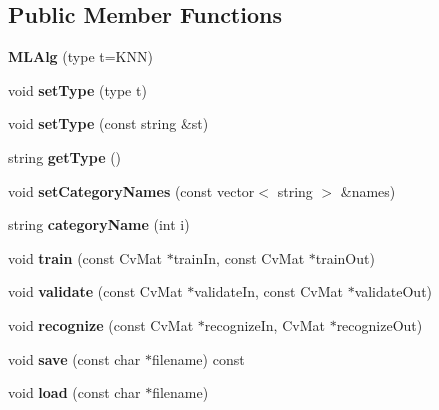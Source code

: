 \subsection*{\-Public \-Member \-Functions}
\begin{DoxyCompactItemize}
\item 
\hypertarget{class_m_l_alg_abe64a2a987f3564d4b8a555bc028a628}{{\bfseries \-M\-L\-Alg} (type t=\-K\-N\-N)}\label{class_m_l_alg_abe64a2a987f3564d4b8a555bc028a628}

\item 
\hypertarget{class_m_l_alg_ad91e8880931c1c1a4cffd06dd9abfbe7}{void {\bfseries set\-Type} (type t)}\label{class_m_l_alg_ad91e8880931c1c1a4cffd06dd9abfbe7}

\item 
\hypertarget{class_m_l_alg_a9189e74165b45c44b404660a67bdbfe8}{void {\bfseries set\-Type} (const string \&st)}\label{class_m_l_alg_a9189e74165b45c44b404660a67bdbfe8}

\item 
\hypertarget{class_m_l_alg_a7cc0abdf363c12ec83ee63119b81d19c}{string {\bfseries get\-Type} ()}\label{class_m_l_alg_a7cc0abdf363c12ec83ee63119b81d19c}

\item 
\hypertarget{class_m_l_alg_a44f120e39108980863a3fac855f89106}{void {\bfseries set\-Category\-Names} (const vector$<$ string $>$ \&names)}\label{class_m_l_alg_a44f120e39108980863a3fac855f89106}

\item 
\hypertarget{class_m_l_alg_ad62d73beb4bd63465a4bf24644df420f}{string {\bfseries category\-Name} (int i)}\label{class_m_l_alg_ad62d73beb4bd63465a4bf24644df420f}

\item 
\hypertarget{class_m_l_alg_af50750d469efca6635f056471423c619}{void {\bfseries train} (const \-Cv\-Mat $\ast$train\-In, const \-Cv\-Mat $\ast$train\-Out)}\label{class_m_l_alg_af50750d469efca6635f056471423c619}

\item 
\hypertarget{class_m_l_alg_af7cd4f07c40c55a603e3a6dcaf5f287d}{void {\bfseries validate} (const \-Cv\-Mat $\ast$validate\-In, const \-Cv\-Mat $\ast$validate\-Out)}\label{class_m_l_alg_af7cd4f07c40c55a603e3a6dcaf5f287d}

\item 
\hypertarget{class_m_l_alg_ae05ba5c235d576a81f2a82eef06448ed}{void {\bfseries recognize} (const \-Cv\-Mat $\ast$recognize\-In, \-Cv\-Mat $\ast$recognize\-Out)}\label{class_m_l_alg_ae05ba5c235d576a81f2a82eef06448ed}

\item 
\hypertarget{class_m_l_alg_a368d08fe8e04e626e56bd17d531ef795}{void {\bfseries save} (const char $\ast$filename) const }\label{class_m_l_alg_a368d08fe8e04e626e56bd17d531ef795}

\item 
\hypertarget{class_m_l_alg_a3651488762f2ba0d7f28e9ee114674bf}{void {\bfseries load} (const char $\ast$filename)}\label{class_m_l_alg_a3651488762f2ba0d7f28e9ee114674bf}

\end{DoxyCompactItemize}
